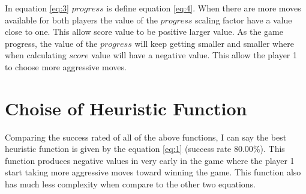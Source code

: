 \documentclass{article}
\begin{document}
In equation \ref{eq:3} $progress$ is define equation \ref{eq:4}. When there are more moves available for both players the value of the $progress$ scaling factor have a value close to one. This allow score value to be positive larger value. As the game progress, the value of the $progress$ will keep getting smaller and smaller where when calculating $score$ value will have a negative value. This allow the player 1 to choose more aggressive moves.

\section*{Choise of Heuristic Function}

Comparing the success rated of all of the above functions, I can say the best heuristic function is given by the equation \ref{eq:1} (success rate $80.00\%$). This function produces negative values in very early in the game where the player 1 start taking more aggressive moves toward winning the game. This function also has much less complexity when compare to the other two equations.
\end{document}
